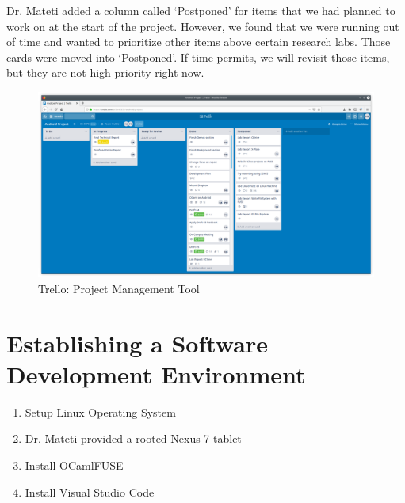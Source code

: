 Dr. Mateti added a column called `Postponed' for items that we had planned to work on at the start of the project. However, we found that we were running out of time and wanted to prioritize other items above certain research labs. Those cards were moved into `Postponed'. If time permits, we will revisit those items, but they are not high priority right now.
\begin{figure}[htb]
  \centering
  \includegraphics[scale=0.2]{images/trello.png}
  \caption{Trello: Project Management Tool}
  \label{fig:trello}
\end{figure}
\section{Establishing a Software Development Environment}
\begin{enumerate}
\item Setup Linux Operating System
\item Dr. Mateti provided a rooted Nexus 7 tablet
\item Install OCamlFUSE
\item Install Visual Studio Code
\end{enumerate}